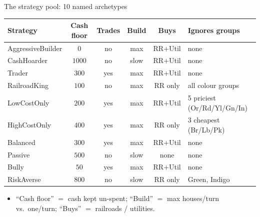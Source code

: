 \documentclass[10pt,aspectratio=169]{beamer}
\begin{document}
\begin{frame}{The strategy pool: 10 named archetypes}
  \centering
  \scriptsize
  \begin{tabular}{lccccl}
    \toprule
    Strategy & Cash floor & Trades & Build & Buys & Ignores groups \\
    \midrule
    AggressiveBuilder & $0$    & no  & max  & RR+Util & none \\
    CashHoarder       & $1000$ & no  & slow & RR+Util & none \\
    Trader            & $300$  & yes & max  & RR+Util & none \\
    RailroadKing      & $100$  & no  & max  & RR only & all colour groups \\
    LowCostOnly       & $200$  & yes & max  & RR+Util & 5 priciest (Or/Rd/Yl/Gn/In) \\
    HighCostOnly      & $400$  & yes & max  & RR only & 3 cheapest (Br/Lb/Pk) \\
    Balanced          & $300$  & yes & max  & RR+Util & none \\
    Passive           & $500$  & no  & slow & none    & none \\
    Bully             & $50$   & yes & max  & RR+Util & none \\
    RiskAverse        & $800$  & no  & slow & RR only & Green, Indigo \\
    \bottomrule
  \end{tabular}
  \vspace{0.7em}
  \begin{itemize}\small
    \item ``Cash floor'' $=$ cash kept un-spent; ``Build'' $=$ max houses/turn vs.\ one/turn; ``Buys'' $=$ railroads / utilities.
  \end{itemize}
\end{frame}
\end{document}
